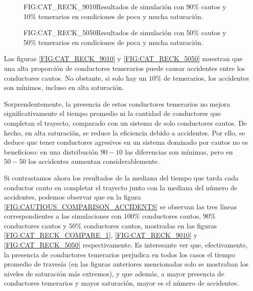 \begin{figure}[Resultados para conductores Cautos y Temerarios, conviviendo 1]{FIG:CAT_RECK_9010}{Resultados de simulación con 90\% cautos y 10\% temerarios en condiciones de poca y mucha saturación.}
     \hspace{1cm}
     \vspace{1cm}
\end{figure}

\begin{figure}[Resultados para conductores Cautos y Temerarios, conviviendo 2]{FIG:CAT_RECK_5050}{Resultados de simulación con 50\% cautos y 50\% temerarios en condiciones de poca y mucha saturación.}
     \hspace{1cm}
     \vspace{1cm}
\end{figure}

Las figuras \ref{FIG:CAT_RECK_9010} y \ref{FIG:CAT_RECK_5050} muestran que una alta proporción de conductores temerarios puede causar accidentes entre los conductores cautos.
No obstante, si solo hay un $10\%$ de temerarios, los accidentes son mínimos, incluso en alta saturación.

Sorprendentemente, la presencia de estos conductores temerarios no mejora significativamente el tiempo promedio ni la cantidad
de conductores que completan el trayecto, comparado con un sistema de solo conductores cautos. De hecho, en alta saturación,
se reduce la eficiencia debido a accidentes. Por ello, se deduce que tener conductores agresivos en un sistema dominado por cautos no
es beneficioso: en una distribución $90-10$ las diferencias son mínimas, pero en $50-50$ los accidentes aumentan considerablemente.

Si contrastamos ahora los resultados de la mediana del tiempo que tarda cada conductor cauto en completar el trayecto junto con la mediana
del número de accidentes, podemos observar que en la figura \ref{FIG:CAUTIOUS_COMPARISON_ACCIDENTS} se observan las tres líneas correspondientes a las simulaciones
con $100\%$ conductores cautos, $90\%$ conductores cautos y $50\%$ conductores cautos, mostradas en las figuras \ref{FIG:CAT_RECK_COMPARE_1},
\ref{FIG:CAT_RECK_9010} y \ref{FIG:CAT_RECK_5050} respectivamente. Es interesante ver que, efectivamente, la presencia de conductores
temerarios perjudica en todos los casos el tiempo promedio de travesía (en las figuras anteriores mencionadas solo se mostraban los niveles
de saturación más extremos), y que además, a mayor presencia de conductores temerarios y mayor saturación, mayor es el número de accidentes.

